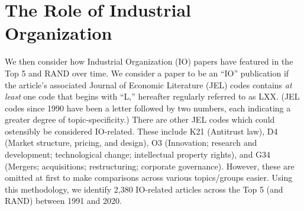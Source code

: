 \documentclass[11pt, letterpaper, twoside]{article}
\begin{document}
\section{The Role of Industrial Organization}
We then consider how Industrial Organization (IO) papers have featured in the Top 5 and RAND over time. We consider a paper to be an ``IO'' publication if the article's associated Journal of Economic Literature (JEL) codes contains \textit{at least} one code that begins with ``L,'' hereafter regularly referred to as LXX. (JEL codes since 1990 have been a letter followed by two numbers, each indicating a greater degree of topic-specificity.) There are other JEL codes which could ostensibly be considered IO-related. These include K21 (Antitrust law), D4 (Market structure, pricing, and design), O3 (Innovation; research and development; technological change; intellectual property rights), and G34 (Mergers; acquisitions; restructuring; corporate governance). However, these are omitted at first to make comparisons across various topics/groups easier. Using this methodology, we identify 2,380 IO-related articles across the Top 5 (and RAND) between 1991 and 2020.\\
\end{document}
